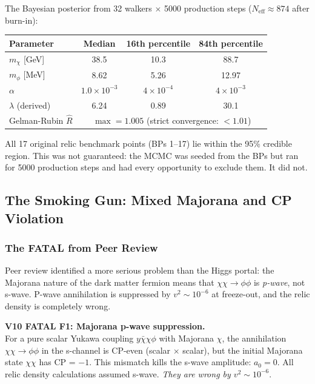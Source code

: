 \documentclass[12pt, a4paper]{article}
\begin{document}
The Bayesian posterior from 32 walkers $\times$ 5000 production steps ($N_\text{eff} \approx 874$ after burn-in):

\begin{center}
\begin{tabular}{lccc}
  \toprule
  Parameter & Median & 16th percentile & 84th percentile \\
  \midrule
  $m_\chi$ [GeV] & 38.5 & 10.3 & 88.7 \\
  $m_\phi$ [MeV] & 8.62 & 5.26 & 12.97 \\
  $\alpha$ & $1.0 \times 10^{-3}$ & $4 \times 10^{-4}$ & $4 \times 10^{-3}$ \\
  $\lambda$ (derived) & 6.24 & 0.89 & 30.1 \\
  \midrule
  Gelman-Rubin $\hat{R}$ & \multicolumn{3}{c}{$\max = 1.005$ (strict convergence: $< 1.01$)} \\
  \bottomrule
\end{tabular}
\end{center}

All 17 original relic benchmark points (BPs 1--17) lie within the 95\% credible region. This was not guaranteed: the MCMC was seeded from the BPs but ran for 5000 production steps and had every opportunity to exclude them. It did not.

\subsection{The Smoking Gun: Mixed Majorana and CP Violation}

\subsubsection{The FATAL from Peer Review}

Peer review identified a more serious problem than the Higgs portal: the Majorana nature of the dark matter fermion means that $\chi\chi \to \phi\phi$ is \emph{p-wave}, not s-wave. P-wave annihilation is suppressed by $v^2 \sim 10^{-6}$ at freeze-out, and the relic density is completely wrong.

\begin{failbox}
\textbf{V10 FATAL F1: Majorana p-wave suppression.}\\
For a pure scalar Yukawa coupling $y\bar\chi\chi\phi$ with Majorana $\chi$,
the annihilation $\chi\chi \to \phi\phi$ in the s-channel is CP-even (scalar $\times$ scalar),
but the initial Majorana state $\chi\chi$ has CP = $-1$. 
This mismatch kills the s-wave amplitude: $a_0 = 0$.
All relic density calculations assumed s-wave. \emph{They are wrong by $v^2 \sim 10^{-6}$}.
\end{failbox}
\end{document}
